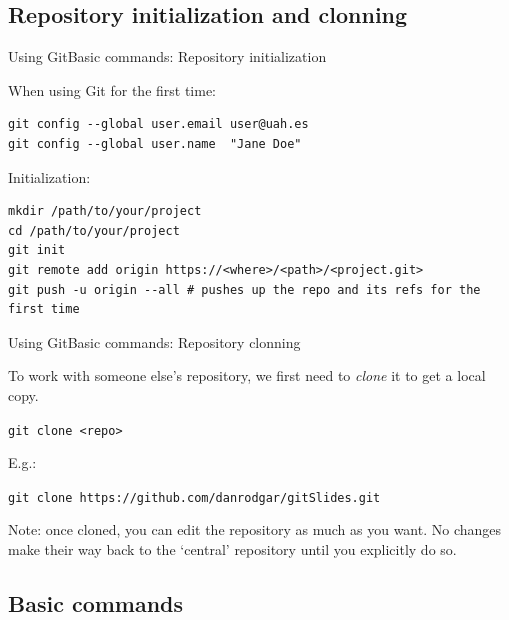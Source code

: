 \documentclass[10pt,compress]{beamer} %
\begin{document}
\subsection{Repository initialization and clonning}


\begin{frame}[fragile]{Using Git}{Basic commands: Repository initialization}

When using Git for the first time:

\begin{verbatim}
git config --global user.email user@uah.es 
git config --global user.name  "Jane Doe"
\end{verbatim}

Initialization:

\begin{verbatim}
mkdir /path/to/your/project
cd /path/to/your/project
git init
git remote add origin https://<where>/<path>/<project.git>
git push -u origin --all # pushes up the repo and its refs for the first time
\end{verbatim} 

\end{frame}

\begin{frame}{Using Git}{Basic commands: Repository clonning}

To work with someone else’s repository, we first need to \emph{clone} it to get a
local copy.

\texttt{git clone <repo>}

E.g.:

\texttt{git clone https://github.com/danrodgar/gitSlides.git}

\begin{footnotesize}Note: once cloned, you can edit the repository as much as you want. No changes make their way back to the ‘central’ repository until you explicitly do so.
\end{footnotesize}
\end{frame}


\subsection{Basic commands}
\end{document}
